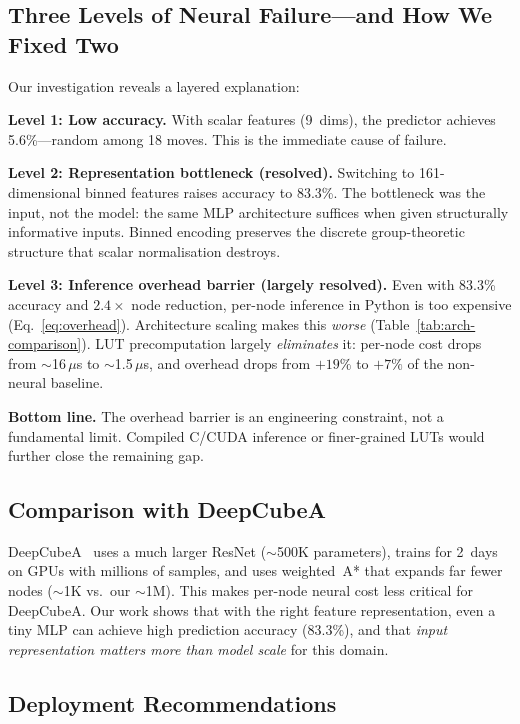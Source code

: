 \documentclass[graybox]{svmult}
\begin{document}
\subsection{Three Levels of Neural Failure---and How We Fixed Two}

Our investigation reveals a layered explanation:

\textbf{Level 1: Low accuracy.} With scalar features (9~dims), the predictor achieves 5.6\%---random among 18 moves. This is the immediate cause of failure.

\textbf{Level 2: Representation bottleneck (resolved).} Switching to 161-dimensional binned features raises accuracy to 83.3\%. The bottleneck was the input, not the model: the same MLP architecture suffices when given structurally informative inputs. Binned encoding preserves the discrete group-theoretic structure that scalar normalisation destroys.

\textbf{Level 3: Inference overhead barrier (largely resolved).} Even with 83.3\% accuracy and $2.4\times$ node reduction, per-node inference in Python is too expensive (Eq.~\ref{eq:overhead}). Architecture scaling makes this \emph{worse} (Table~\ref{tab:arch-comparison}). LUT precomputation largely \emph{eliminates} it: per-node cost drops from $\sim$16\,$\mu$s to $\sim$1.5\,$\mu$s, and overhead drops from $+19\%$ to $+7\%$ of the non-neural baseline.

\textbf{Bottom line.} The overhead barrier is an engineering constraint, not a fundamental limit. Compiled C/CUDA inference or finer-grained LUTs would further close the remaining gap.

\subsection{Comparison with DeepCubeA}

DeepCubeA~\cite{deepcubea} uses a much larger ResNet ($\sim$500K parameters), trains for 2~days on GPUs with millions of samples, and uses weighted~A* that expands far fewer nodes ($\sim$1K vs.\ our $\sim$1M). This makes per-node neural cost less critical for DeepCubeA. Our work shows that with the right feature representation, even a tiny MLP can achieve high prediction accuracy (83.3\%), and that \emph{input representation matters more than model scale} for this domain.

\subsection{Deployment Recommendations}
\end{document}
